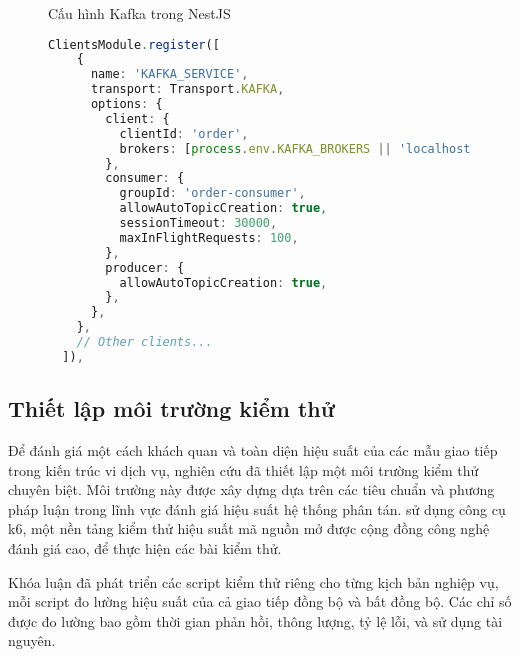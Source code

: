 \begin{figure}[H]{Cấu hình Kafka trong NestJS}
  \centering
  \begin{minipage}{\textwidth}
    \begin{lstlisting}[language=Typescript, basicstyle=\scriptsize\ttfamily]
  ClientsModule.register([
    {
      name: 'KAFKA_SERVICE',
      transport: Transport.KAFKA,
      options: {
        client: {
          clientId: 'order',
          brokers: [process.env.KAFKA_BROKERS || 'localhost:9092'],
        },
        consumer: {
          groupId: 'order-consumer',
          allowAutoTopicCreation: true,
          sessionTimeout: 30000,
          maxInFlightRequests: 100,
        },
        producer: {
          allowAutoTopicCreation: true,
        },
      },
    },
    // Other clients...
  ]),
  \end{lstlisting}
  \end{minipage}
\end{figure}

\subsection{Thiết lập môi trường kiểm thử}
Để đánh giá một cách khách quan và toàn diện hiệu suất của các mẫu giao tiếp trong kiến trúc vi dịch vụ, nghiên cứu đã thiết lập một môi trường kiểm thử chuyên biệt. Môi trường này được xây dựng dựa trên các tiêu chuẩn và phương pháp luận trong lĩnh vực đánh giá hiệu suất hệ thống phân tán. sử dụng công cụ k6, một nền tảng kiểm thử hiệu suất mã nguồn mở được cộng đồng công nghệ đánh giá cao, để thực hiện các bài kiểm thử.

Khóa luận đã phát triển các script kiểm thử riêng cho từng kịch bản nghiệp vụ, mỗi script đo lường hiệu suất của cả giao tiếp đồng bộ và bất đồng bộ. Các chỉ số được đo lường bao gồm thời gian phản hồi, thông lượng, tỷ lệ lỗi, và sử dụng tài nguyên.


